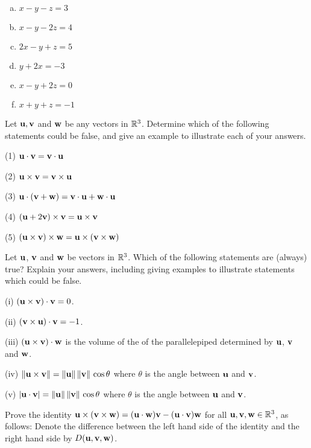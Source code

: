 \begin{prob}
\begin{enumerate}[a)]
\item  $x - y - z = 3$\medskip 
%  
\item\sov $x - y - 2z = 4$ \medskip
% 
\item $2x - y + z = 5$ \medskip
% 
\item $y + 2x = -3$ \medskip
% 
\item $x - y + 2z = 0$ \medskip
% 
\item  $x + y + z = -1$\medskip
% 
\end{enumerate}


\end{prob} \begin{prob} \label{prob03.8}\sov  Let $\mathbf{u}, \mathbf{v}$ and $\mathbf{w}$ be any vectors in $\mathbb{R}^3$.  Determine which  of the following statements could be false, and give an example to illustrate each of your answers.
 \medskip

(1)  $\mathbf{u}\cdot \mathbf{v}=\mathbf{v}\cdot \mathbf{u}$

(2)  $\mathbf{u}\times\mathbf{v}=\mathbf{v}\times \mathbf{u}$

(3)  $\mathbf{u}\cdot(\mathbf{v}+\mathbf{w})=\mathbf{v}\cdot \mathbf{u}+\mathbf{w}\cdot \mathbf{u}$

(4)  $(\mathbf{u}+2\mathbf{v})\times \mathbf{v}=\mathbf{u}\times \mathbf{v}$

(5)  $(\mathbf{u}\times \mathbf{v})\times \mathbf{w}=\mathbf{u}\times(\mathbf{v}\times \mathbf{w})$


\end{prob} \begin{prob} \label{prob03.9}\sov  Let $\mathbf{u}$, $\mathbf{v} $ and $\mathbf{w} $ be vectors in $\mathbb{R}^3$.  Which of the following
statements are (always) true? Explain your answers, including  giving examples to illustrate statements which could be false.
\medskip

(i)  $(\mathbf{u}\times \mathbf{v})\cdot \mathbf{v}=0$.
 

(ii)  $(\mathbf{v}\times \mathbf{u})\cdot \mathbf{v}=-1$.
 

(iii)  $(\mathbf{u}\times\mathbf{v})\cdot \mathbf{w}$ is the volume of the of the parallelepiped  determined by $\mathbf{u}$, $\mathbf{v}$ and $\mathbf{w}$.
 

(iv)  $\Vert \mathbf{u}\times \mathbf{v}\Vert=\Vert \mathbf{u} \Vert \, \Vert \mathbf{v} \Vert\,\cos\theta$
where $\theta$ is the angle between $\mathbf{u}$ and $\mathbf{v}$.
 

(v)  $|\mathbf{u}\cdot \mathbf{v}|=\Vert \mathbf{u} \Vert \, \Vert \mathbf{v} \Vert\,\cos\theta$
where $\theta$ is the angle between $\mathbf{u}$ and $\mathbf{v}$.



\end{prob} \begin{prob} \label{prob03.10} Prove the identity $\mathbf{u} \times (\mathbf{v}\times \mathbf{w})= (\mathbf{u}\cdot \mathbf{w}) \mathbf{v} -(\mathbf{u}\cdot \mathbf{v}) \mathbf{w}$ for all $\mathbf{u},\mathbf{v},\mathbf{w} \in \mathbb{R}^3$, as follows: Denote the difference between the left hand side of the identity  and the right hand side by $D(\mathbf{u},\mathbf{v},\mathbf{w})$.


\end{prob}
